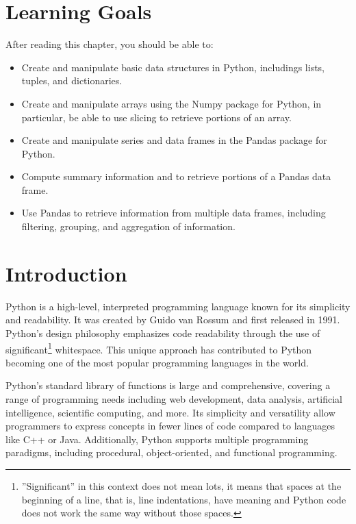 %
%
\section*{Learning Goals}

After reading this chapter, you should be able to:
\begin{itemize}
   \item Create and manipulate basic data structures in Python, includings lists, tuples, and dictionaries.
   \item Create and manipulate arrays using the Numpy package for Python, in particular, be able to use slicing to retrieve portions of an array.
   \item Create and manipulate series and data frames in the Pandas package for Python.
   \item Compute summary information and to retrieve portions of a Pandas data frame.
   \item Use Pandas to retrieve information from multiple data frames, including filtering, grouping, and aggregation of information.
\end{itemize}

\section{Introduction}

Python is a high-level, interpreted programming language known for its simplicity and readability. It was created by Guido van Rossum and first released in 1991. Python's design philosophy emphasizes code readability through the use of significant\footnote{''Significant'' in this context does not mean lots, it means that spaces at the beginning of a line, that is, line indentations, have meaning and Python code does not work the same way without those spaces.} whitespace. This unique approach has contributed to Python becoming one of the most popular programming languages in the world.

Python's standard library of functions is large and comprehensive, covering a range of programming needs including web development, data analysis, artificial intelligence, scientific computing, and more. Its simplicity and versatility allow programmers to express concepts in fewer lines of code compared to languages like C++ or Java. Additionally, Python supports multiple programming paradigms, including procedural, object-oriented, and functional programming.

